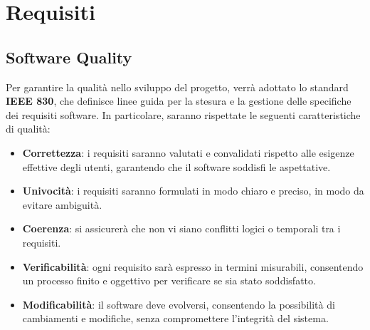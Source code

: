 \documentclass[a4paper,12pt]{article}
\begin{document}
\section{Requisiti}
\subsection{Software Quality}
Per garantire la qualità nello sviluppo del progetto, verrà adottato lo standard \textbf{IEEE 830}, che definisce linee guida per la stesura e la gestione delle specifiche dei requisiti software. In particolare, saranno rispettate le seguenti caratteristiche di qualità:

\begin{itemize}
    \item \textbf{Correttezza}: i requisiti saranno valutati e convalidati rispetto alle esigenze effettive degli utenti, garantendo che il software soddisfi le aspettative.
    \item \textbf{Univocità}: i requisiti saranno formulati in modo chiaro e preciso, in modo da evitare ambiguità.
    \item \textbf{Coerenza}: si assicurerà che non vi siano conflitti logici o temporali tra i requisiti.
    \item \textbf{Verificabilità}: ogni requisito sarà espresso in termini misurabili, consentendo un processo finito e oggettivo per verificare se sia stato soddisfatto.
    \item \textbf{Modificabilità}: il software deve evolversi, consentendo la possibilità di cambiamenti e modifiche, senza compromettere l’integrità del sistema.
\end{itemize}
\end{document}
